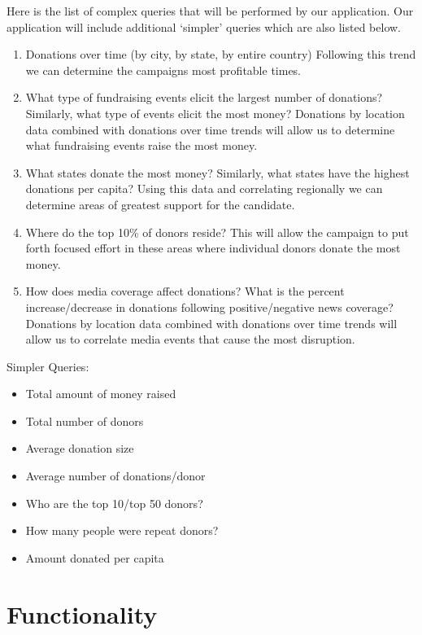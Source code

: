 \documentclass[12pt]{article}
\begin{document}
    Here is the list of complex queries that will be performed by our application. Our application will include additional ‘simpler’ queries which are also listed below.
\begin{enumerate}
\item Donations over time (by city, by state, by entire country)
Following this trend we can determine the campaigns most profitable times.

\item What type of fundraising events elicit the largest number of donations? Similarly, what type of events elicit the most money?
Donations by location data combined with donations over time trends will allow us to determine what fundraising events raise the most money.

\item What states donate the most money? Similarly, what states have the highest donations per capita?
Using this data and correlating regionally we can determine areas of greatest support for the candidate.

\item Where do the top 10\% of donors reside?
This will allow the campaign to put forth focused effort in these areas where individual donors donate the most money.

\item How does media coverage affect donations? What is the percent increase/decrease in donations following positive/negative news coverage?
Donations by location data combined with donations over time trends will allow us to correlate media events that cause the most disruption.
\end{enumerate}
Simpler Queries:
\begin{itemize}
\item Total amount of money raised
\item Total number of donors
\item Average donation size
\item Average number of donations/donor
\item Who are the top 10/top 50 donors?
\item How many people were repeat donors?
\item Amount donated per capita
\end{itemize}

\section{Functionality}
\end{document}
